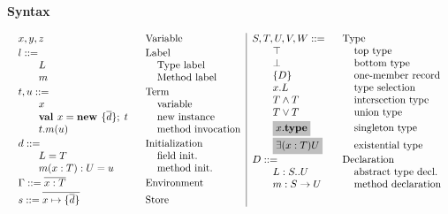 
{\bf Syntax}\medskip
    
$\ba{l@{\hspace{0.2mm}}|@{\hspace{0.2mm}}l}
\ba[t]{l@{\hspace{10mm}}l}
x, y, z    & \lindent{\mbox{Variable}} \\[0.2em]
l ::=      & \lindent{\mbox{Label}} \\
\gap L     & \mbox{Type label}\\
\gap m     & \mbox{Method label}\\[0.2em]
t, u ::=      & \lindent{\mbox{Term}} \\
\gap x     & \mbox{variable} \\
\gap \trmnew x {\seq{d}} t & \mbox{new instance} \\
\gap \trmcall t m u & \mbox{method invocation} \\[0.2em]
d ::= & \lindent{\mbox{Initialization}} \\
\gap \deftyp L T        & \mbox{field init.}\\
\gap \defmtd m x T U u  & \mbox{method init.}\\[0.2em]
\Gamma ::= \seq{x \typ T} & \lindent\mbox{Environment} \\[0.2em]
s      ::= \seq{x \mapsto \{\seq{d}\}} & \lindent\mbox{Store} \\
\ea
&

\ba[t]{l@{\hspace{10mm}}l}
S,T,U,V,W ::= & \lindent\mbox{Type}\\
\gap \Top  & \mbox{top type} \\
\gap \Bot  & \mbox{bottom type} \\
\gap \{D\} & \mbox{one-member record} \\
\gap x.L & \mbox{type selection} \\
\gap T \tand T & \mbox{intersection type} \\
\gap T \tor T  & \mbox{union type} \\[0.2em]
\gap \highlight{$x\sing$}    & \mbox{singleton type} \\[0.3em]
\gap \highlight{$\exTyp x T U$} & \mbox{existential type} \\
D ::= & \lindent\mbox{Declaration} \\
\gap \Ldecl {L} S U & \mbox{abstract type decl.} \\
\gap \mdecl m S U & \mbox{method declaration}
\ea
\ea$
